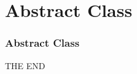 \documentclass{beamer}
\begin{document}
\section{Abstract Class}

\begin{frame}
\frametitle{Abstract Class}
\end{frame}

\begin{frame}
\Huge{\centerline{THE END }}
\end{frame}

\end{document}
